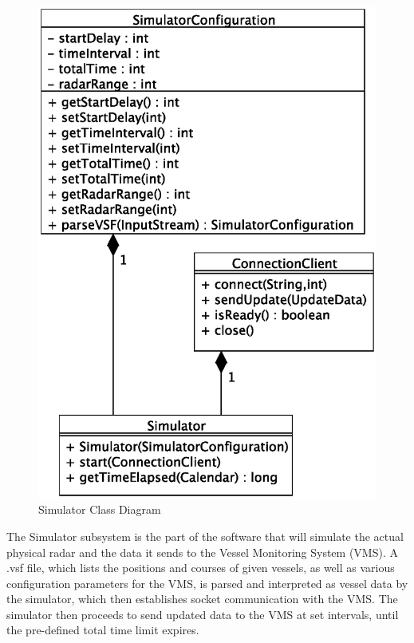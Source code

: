 \documentclass{article}
\begin{document}
\begin{figure}[!htb]
\caption{Simulator Class Diagram}
\centering
\includegraphics[scale=0.6]{diagrams/simulator-class-diagram.eps}
\end{figure}

The Simulator subsystem is the part of the software that will simulate the actual physical radar and the data it sends to the Vessel Monitoring System (VMS). A .vsf file, which lists the positions and courses of given vessels, as well as various configuration parameters for the VMS, is parsed and interpreted as vessel data by the simulator, which then establishes socket communication with the VMS. The simulator then proceeds to send updated data to the VMS at set intervals, until the pre-defined total time limit expires.

\break
\end{document}
